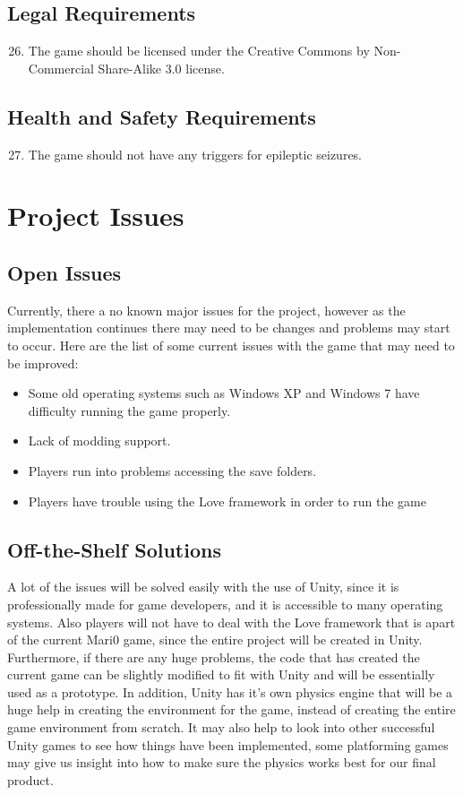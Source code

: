 \documentclass[12pt, titlepage]{article}
\begin{document}
\subsection{Legal Requirements}
\begin{enumerate}
\setcounter{enumi}{25}
	\item The game should be licensed under the Creative Commons by Non-Commercial Share-Alike 3.0 license. 
\end{enumerate}

\subsection{Health and Safety Requirements}
\begin{enumerate}
\setcounter{enumi}{26}
	\item The game should not have any triggers for epileptic seizures.
\end{enumerate}

\section{Project Issues}

\subsection{Open Issues}
Currently, there a no known major issues for the project, however as the implementation continues there may need to be changes and problems may start to occur. 
Here are the list of some current issues with the game that may need to be improved:
\begin{itemize}
\item Some old operating systems such as Windows XP and Windows 7 have difficulty running the game properly.
\item Lack of modding support.
\item Players run into problems accessing the save folders.
\item Players have trouble using the Love framework in order to run the game
\end{itemize}

\subsection{Off-the-Shelf Solutions}
A lot of the issues will be solved easily with the use of Unity, since it is professionally made for game developers, and it is accessible to many operating systems. Also players will not have to deal with the Love framework that is apart of the current Mari0 game, since the entire project will be created in Unity.
Furthermore, if there are any huge problems, the code that has created the current game can be slightly modified to fit with Unity and will be essentially used as a prototype. In addition, Unity has it's own physics engine that will be a huge help in creating the environment for the game, instead of creating the entire game environment from scratch.
It may also help to look into other successful Unity games to see how things have been implemented, some platforming games may give us insight into how to make sure the physics works best for our final product. 
\end{document}
